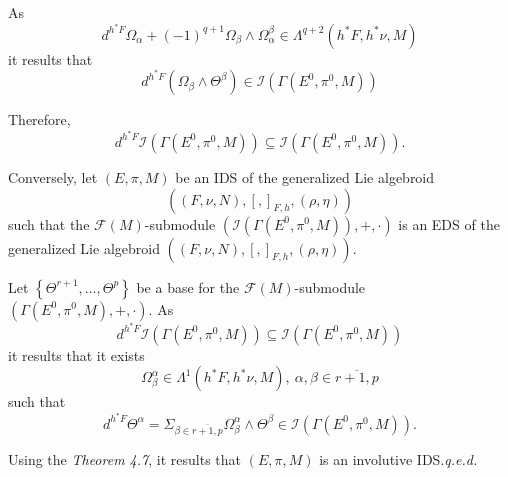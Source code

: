 \documentclass[11pt]{article}
\begin{document}
As
\begin{equation*}
d^{h^{\ast }F}\Omega _{\alpha }+\left( -1\right) ^{q+1}\Omega _{\beta
}\wedge \Omega _{\alpha }^{\beta }\in \Lambda ^{q+2}\left( h^{\ast
}F,h^{\ast }\nu ,M\right)
\end{equation*}%
it results that
\begin{equation*}
d^{h^{\ast }F}\left( \Omega _{\beta }\wedge \Theta ^{\beta }\right) \in
\mathcal{I}\left( \Gamma \left( E^{0},\pi ^{0},M\right) \right)
\end{equation*}

Therefore,
\begin{equation*}
d^{h^{\ast }F}\mathcal{I}\left( \Gamma \left( E^{0},\pi ^{0},M\right)
\right) \subseteq \mathcal{I}\left( \Gamma \left( E^{0},\pi ^{0},M\right)
\right) .
\end{equation*}

Conversely, let $\left( E,\pi ,M\right) $ be an IDS of the generalized Lie
algebroid
\begin{equation*}
\left( \left( F,\nu ,N\right) ,\left[ ,\right] _{F,h},\left( \rho ,\eta
\right) \right)
\end{equation*}%
such that the $\mathcal{F}\left( M\right) $-submodule $\left( \mathcal{I}%
\left( \Gamma \left( E^{0},\pi ^{0},M\right) \right) ,+,\cdot \right) $ is
an EDS of the generalized Lie algebroid $\left( \left( F,\nu ,N\right) ,%
\left[ ,\right] _{F,h},\left( \rho ,\eta \right) \right) .$

Let $\left\{ \Theta ^{r+1},...,\Theta ^{p}\right\} $ be a base for the $%
\mathcal{F}\left( M\right) $-submodule $\left( \Gamma \left( E^{0},\pi
^{0},M\right) ,+,\cdot \right) .$ As
\begin{equation*}
d^{h^{\ast }F}\mathcal{I}\left( \Gamma \left( E^{0},\pi ^{0},M\right)
\right) \subseteq \mathcal{I}\left( \Gamma \left( E^{0},\pi ^{0},M\right)
\right)
\end{equation*}%
it results that it exists
\begin{equation*}
\Omega _{\beta }^{\alpha }\in \Lambda ^{1}\left( h^{\ast }F,h^{\ast }\nu
,M\right) ,~\alpha ,\beta \in \overline{r+1,p}
\end{equation*}%
such that
\begin{equation*}
d^{h^{\ast }F}\Theta ^{\alpha }=\Sigma _{\beta \in \overline{r+1,p}}\Omega
_{\beta }^{\alpha }\wedge \Theta ^{\beta }\in \mathcal{I}\left( \Gamma
\left( E^{0},\pi ^{0},M\right) \right) .
\end{equation*}

Using the \emph{Theorem 4.7}, it results that $\left( E,\pi ,M\right) $ is
an involutive IDS.\hfill \emph{q.e.d.}\medskip
\end{document}
